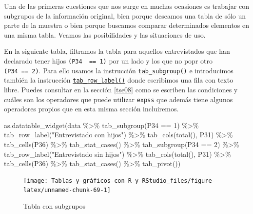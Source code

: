 \documentclass[
]{book}
\newenvironment{Shaded}{\begin{snugshade}}{\end{snugshade}}
\newcommand{\DecValTok}[1]{\textcolor[rgb]{0.00,0.00,0.81}{#1}}
\newcommand{\FunctionTok}[1]{\textcolor[rgb]{0.00,0.00,0.00}{#1}}
\newcommand{\NormalTok}[1]{#1}
\newcommand{\SpecialCharTok}[1]{\textcolor[rgb]{0.00,0.00,0.00}{#1}}
\newcommand{\StringTok}[1]{\textcolor[rgb]{0.31,0.60,0.02}{#1}}
\begin{document}
Una de las primeras cuestiones que nos surge en muchas ocasiones es trabajar con subgrupos de la información original, bien porque deseamos una tabla de sólo un parte de la muestra o bien porque buscamos comparar determinados elementos en una misma tabla. Veamos las posibilidades y las situaciones de uso.

En la siguiente tabla, filtramos la tabla para aquellos entrevistados que han declarado tener hijos \texttt{(P34\ \ ==\ 1)} por un lado y los que no popr otro \texttt{(P34\ ==\ 2)}. Para ello usamos la instrucción \href{https://rdrr.io/cran/expss/man/tables.html}{\texttt{tab\_subgroup()}} e introducimos también la instrucción \href{https://rdrr.io/cran/expss/man/tables.html}{\texttt{tab\_row\_label()}} donde escribimos una fila con texto libre. Puedes consultar en la sección \ref{tse08} como se escriben las condiciones y cuáles son los operadores que puede utilizar \texttt{expss} que además tiene algunos operadores propios que en esta misma sección incluiremos.

\begin{Shaded}
\begin{Highlighting}[]
\FunctionTok{as.datatable\_widget}\NormalTok{(data }\SpecialCharTok{\%\textgreater{}\%} \FunctionTok{tab\_subgroup}\NormalTok{(P34 }\SpecialCharTok{==} \DecValTok{1}\NormalTok{) }\SpecialCharTok{\%\textgreater{}\%} \FunctionTok{tab\_row\_label}\NormalTok{(}\StringTok{"Entrevistado con hijos"}\NormalTok{) }\SpecialCharTok{\%\textgreater{}\%} 
  \FunctionTok{tab\_cols}\NormalTok{(}\FunctionTok{total}\NormalTok{(), P31) }\SpecialCharTok{\%\textgreater{}\%} \FunctionTok{tab\_cells}\NormalTok{(P36) }\SpecialCharTok{\%\textgreater{}\%} \FunctionTok{tab\_stat\_cases}\NormalTok{() }\SpecialCharTok{\%\textgreater{}\%} 
  \FunctionTok{tab\_subgroup}\NormalTok{(P34 }\SpecialCharTok{==} \DecValTok{2}\NormalTok{) }\SpecialCharTok{\%\textgreater{}\%} \FunctionTok{tab\_row\_label}\NormalTok{(}\StringTok{"Entrevistado sin hijos"}\NormalTok{) }\SpecialCharTok{\%\textgreater{}\%} 
  \FunctionTok{tab\_cols}\NormalTok{(}\FunctionTok{total}\NormalTok{(), P31) }\SpecialCharTok{\%\textgreater{}\%} \FunctionTok{tab\_cells}\NormalTok{(P36) }\SpecialCharTok{\%\textgreater{}\%} \FunctionTok{tab\_stat\_cases}\NormalTok{() }\SpecialCharTok{\%\textgreater{}\%} 
  \FunctionTok{tab\_pivot}\NormalTok{())}
\end{Highlighting}
\end{Shaded}

\begin{figure}[H]

{\centering \texttt{[image: Tablas-y-gráficos-con-R-y-RStudio\_files/figure-latex/unnamed-chunk-69-1]} 

}

\caption{Tabla con subgrupos}\label{fig:unnamed-chunk-69}
\end{figure}
\end{document}
